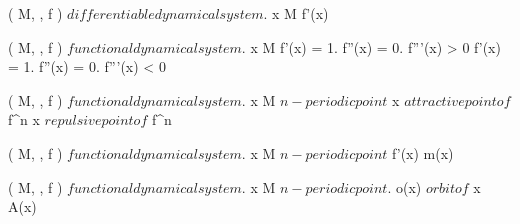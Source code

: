 \documentclass[../Main/main]{subfiles}
\begin{document}
{	
	{
		{
			( M, \N, f ) $ differentiable dynamical system $.
			x \in M
		}
		{
			f'(x) \in {}
		}
	}


	{
		{
			( M, \N, f ) $ functional dynamical system $.
			x \in M
		}
		{
			f'(x) = 1.
			f''(x) = 0.
			f'''(x) > 0
		}
		{
			f'(x) = 1.
			f''(x) = 0.
			f'''(x) < 0
		}
	}
	
	
	{
		{
			( M, \N, f ) $ functional dynamical system $.
			x \in M $ n-periodic point $
		}
		{
			x $ attractive point of $ f^n
		}
		{
			x $ repulsive point of $ f^n
		}
	}
	
	
	{
		{
			( M, \N, f ) $ functional dynamical system $.
			x \in M $ n-periodic point $
		}
		{
			f'(x)
		}
		\denote
		{
			m(x)
		}
	}
	
	
	{
		{
			( M, \N, f ) $ functional dynamical system $.
			x \in M $ n-periodic point $.
			o(x) $ orbit of $ x
		}
		{
		}
		\denote
		{
			A(x)
		}
	}
	
	
	
	
	
	
	
	
	
	
	
	
	

}
\end{document}
